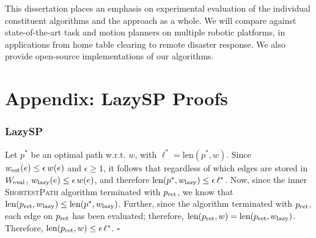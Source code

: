 \documentclass[nobib]{tufte-book}
\newcommand{\ms}[1]{\mbox{\scriptsize #1}}
\newcommand{\cdnote}[1]{{\xxnote{CD}{blue}{#1}}}
\newcommand{\xxnote}[3]{}
\renewcommand{\xxnote}[3]{\color{#2}{#1: #3}}
\newenvironment{proof}[1][Proof]{\begin{trivlist}
   \item[\hskip \labelsep {\bfseries #1}]}{\hfill$\square$\end{trivlist}}
\begin{document}
\begin{fullwidth}
\begin{adjustwidth}{1in}{1in}
This dissertation places an emphasis on experimental evaluation
of the individual constituent algorithms
and the approach as a whole.
We will compare against
state-of-the-art task and motion planners
on multiple robotic platforms,
in applications from home table clearing
to remote disaster response.
We also provide open-source implementations of our algorithms.

\cdnote{Add acknowledgements!}

\end{adjustwidth}
\end{fullwidth}

\tableofcontents













\appendix

\chapter{Appendix: LazySP Proofs}
\label{sec:appendix-proofs}

\subsection{LazySP}

\begin{proof}[Proof of Theorem \ref{thm:lazy-optimality}]
Let $p^*$ be an optimal path w.r.t. $w$,
with $\ell^* = \mbox{len}(p^*, w)$.
Since $w_{\ms{est}}(e) \leq \epsilon \, w(e)$ and $\epsilon \geq 1$,
it follows that regardless of which edges are stored in $W_{\ms{eval}}$,
$w_{\ms{lazy}}(e) \leq \epsilon \, w(e)$,
and therefore
$\mbox{len}(p^*, w_{\ms{lazy}}) \leq \epsilon \, \ell^*$.
Now,
since the inner \textsc{ShortestPath} algorithm terminated with
$p_{\ms{ret}}$,
we know that
$\mbox{len}(p_{\ms{ret}}, w_{\ms{lazy}}) \leq \mbox{len}(p^*, w_{\ms{lazy}})$.
Further,
since the algorithm terminated with $p_{\ms{ret}}$,
each edge on $p_{\ms{ret}}$ has been evaluated;
therefore,
$\mbox{len}(p_{\ms{ret}}, w) = \mbox{len}(p_{\ms{ret}}, w_{\ms{lazy}})$.
Therefore,
$\mbox{len}(p_{\ms{ret}}, w) \leq \epsilon \, \ell^*$.
\end{proof}
\end{document}
